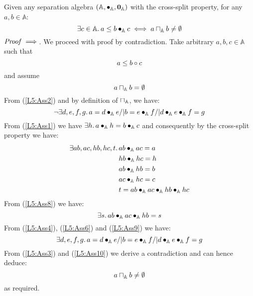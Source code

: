 %
%
%
\begin{lemma}[]\label{lem:nonEmptyOverlap}Given any separation algebra $(\mathbb{A}, \bullet_{\mathbb{A}}, \mathbf{0}_{\mathbb{A}})$ with the cross-split property, for any $a, b \in \mathbb{A}$:
%
\[
	\exists c \in \mathbb{A}.\, a \leq b \bullet_{\mathbb{A}} c \iff a \sqcap_{\mathbb{A}} b \not= \emptyset
\]
%
$\mathit{Proof} \implies$. We proceed with proof by contradiction.
Take arbitrary $a, b, c \in \mathbb{A}$ such that 
%
\begin{equation}
	a \leq b \circ c \label{L5:Ass1}
\end{equation}
%
and assume
%
\begin{equation}
	a \sqcap_{\mathbb{A}} b = \emptyset \label{L5:Ass2}
\end{equation}
%
From (\ref{L5:Ass2}) and by definition of $\sqcap_{\mathbb{A}}$, we have:
%
\begin{equation}
	\neg\exists d, e, f, g.\, a = d \bullet_{\mathbb{A}} e /| b = e \bullet_{\mathbb{A}} f /| d \bullet_{\mathbb{A}} e \bullet_{\mathbb{A}} f = g \label{L5:Ass3}
\end{equation}
%
From (\ref{L5:Ass1}) we have $\exists h.\, a \bullet_{\mathbb{A}} h = b \bullet_{\mathbb{A}} c$ and consequently by the cross-split property we have:
%
\begin{align}
	\exists ab, ac, hb, hc, t.\, &
	ab \bullet_{\mathbb{A}} ac = a 	\label{L5:Ass4}\\
	& hb \bullet_{\mathbb{A}} hc = h \label{L5:Ass5}\\
	& ab \bullet_{\mathbb{A}} hb = b \label{L5:Ass6}\\
	& ac \bullet_{\mathbb{A}} hc = c \label{L5:Ass7}\\
	& t = ab \bullet_{\mathbb{A}} ac \bullet_{\mathbb{A}} hb \bullet_{\mathbb{A}} hc \label{L5:Ass8}
\end{align}
%
From (\ref{L5:Ass8}) we have:
%
\begin{equation}
	\exists s.\, ab \bullet_{\mathbb{A}} ac \bullet_{\mathbb{A}} hb = s \label{L5:Ass9}
\end{equation}
%
From (\ref{L5:Ass4}), (\ref{L5:Ass6}) and (\ref{L5:Ass9}) we have: 
%
\begin{equation}
	\exists d, e, f, g.\, a = d \bullet_{\mathbb{A}} e /| b = e \bullet_{\mathbb{A}} f /| d \bullet_{\mathbb{A}} e \bullet_{\mathbb{A}} f = g \label{L5:Ass10}
\end{equation}
%
From (\ref{L5:Ass3}) and (\ref{L5:Ass10}) we derive a contradiction and can hence deduce:
%
\begin{equation}
	a \sqcap_{\mathbb{A}} b \not= \emptyset \nonumber
\end{equation}
%
as required.\\



\end{lemma}
